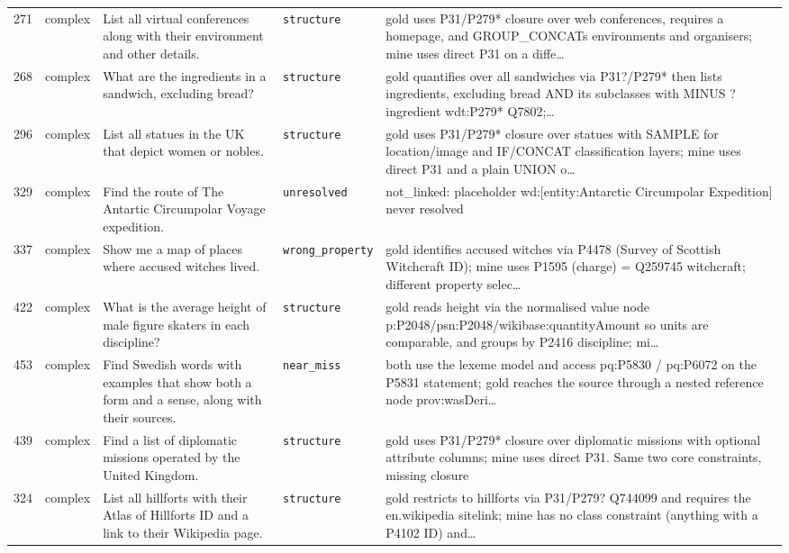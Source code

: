 \begin{longtable}{@{}r >{\raggedright\arraybackslash}p{1.7cm} >{\raggedright\arraybackslash}p{4.6cm} >{\raggedright\arraybackslash}p{2.5cm} >{\raggedright\arraybackslash}p{4.4cm}@{}}
271 & complex & List all virtual conferences along with their environment and other details. & \texttt{structure} & gold uses P31/\allowbreak{}P279* closure over web conferences, requires a homepage, and GROUP\_CONCATs environments and organisers; mine uses direct P31 on a diffe\ldots{} \\
268 & complex & What are the ingredients in a sandwich, excluding bread? & \texttt{structure} & gold quantifies over all sandwiches via P31?/\allowbreak{}P279* then lists ingredients, excluding bread AND its subclasses with MINUS ?ingredient wdt:P279* Q7802;\ldots{} \\
296 & complex & List all statues in the UK that depict women or nobles. & \texttt{structure} & gold uses P31/\allowbreak{}P279* closure over statues with SAMPLE for location/\allowbreak{}image and IF/\allowbreak{}CONCAT classification layers; mine uses direct P31 and a plain UNION o\ldots{} \\
329 & complex & Find the route of The Antartic Circumpolar Voyage expedition. & \texttt{unresolved} & not\_linked: placeholder wd:[entity:Antarctic Circumpolar Expedition] never resolved \\
337 & complex & Show me a map of places where accused witches lived. & \texttt{wrong\_property} & gold identifies accused witches via P4478 (Survey of Scottish Witchcraft ID); mine uses P1595 (charge) = Q259745 witchcraft; different property selec\ldots{} \\
422 & complex & What is the average height of male figure skaters in each discipline? & \texttt{structure} & gold reads height via the normalised value node p:P2048/\allowbreak{}psn:P2048/\allowbreak{}wikibase:quantityAmount so units are comparable, and groups by P2416 discipline; mi\ldots{} \\
453 & complex & Find Swedish words with examples that show both a form and a sense, along with their sources. & \texttt{near\_miss} & both use the lexeme model and access pq:P5830 /\allowbreak{} pq:P6072 on the P5831 statement; gold reaches the source through a nested reference node prov:wasDeri\ldots{} \\
439 & complex & Find a list of diplomatic missions operated by the United Kingdom. & \texttt{structure} & gold uses P31/\allowbreak{}P279* closure over diplomatic missions with optional attribute columns; mine uses direct P31. Same two core constraints, missing closure \\
324 & complex & List all hillforts with their Atlas of Hillforts ID and a link to their Wikipedia page. & \texttt{structure} & gold restricts to hillforts via P31/\allowbreak{}P279? Q744099 and requires the en.wikipedia sitelink; mine has no class constraint (anything with a P4102 ID) and\ldots{} \\

\end{longtable}
